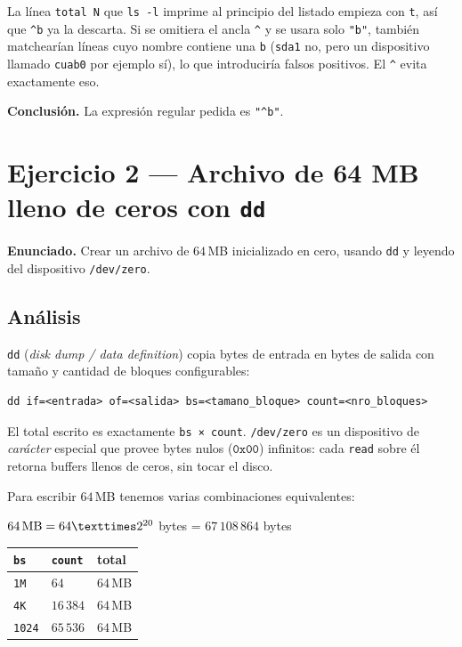 \documentclass[11pt,a4paper]{article}
\begin{document}
\begin{idea}
La línea \texttt{total N} que \texttt{ls -l} imprime al principio del
listado empieza con \texttt{t}, así que \verb|^b| ya la descarta. Si
se omitiera el ancla \verb|^| y se usara solo \verb|"b"|, también
matchearían líneas cuyo nombre contiene una \texttt{b} (\texttt{sda1}
no, pero un dispositivo llamado \texttt{cuab0} por ejemplo sí), lo que
introduciría falsos positivos. El \verb|^| evita exactamente eso.
\end{idea}

\textbf{Conclusión.} La expresión regular pedida es \texttt{"\textasciicircum b"}.

\section{Ejercicio 2 --- Archivo de 64 MB lleno de ceros con \texttt{dd}}

\textbf{Enunciado.} Crear un archivo de $64$\,MB inicializado en cero,
usando \texttt{dd} y leyendo del dispositivo \texttt{/dev/zero}.

\subsection*{Análisis}

\texttt{dd} (\emph{disk dump / data definition}) copia bytes de
entrada en bytes de salida con tamaño y cantidad de bloques
configurables:

\begin{lstlisting}[style=shellstyle]
dd if=<entrada> of=<salida> bs=<tamano_bloque> count=<nro_bloques>
\end{lstlisting}

El total escrito es exactamente \texttt{bs × count}. \texttt{/dev/zero}
es un dispositivo de \emph{carácter} especial que provee bytes nulos
($\texttt{0x00}$) infinitos: cada \texttt{read} sobre él retorna
buffers llenos de ceros, sin tocar el disco.

Para escribir $64$\,MB tenemos varias combinaciones equivalentes:

\quad $64 \text{\,MB} = 64 × 2^{20}$ bytes = $67\,108\,864$ bytes

\begin{center}
\small
\begin{tabular}{@{}lll@{}}
\toprule
\texttt{bs} & \texttt{count} & total \\
\midrule
\texttt{1M}    & $64$         & $64$\,MB \\
\texttt{4K}    & $16\,384$    & $64$\,MB \\
\texttt{1024}  & $65\,536$    & $64$\,MB \\
\bottomrule
\end{tabular}
\end{center}
\end{document}
